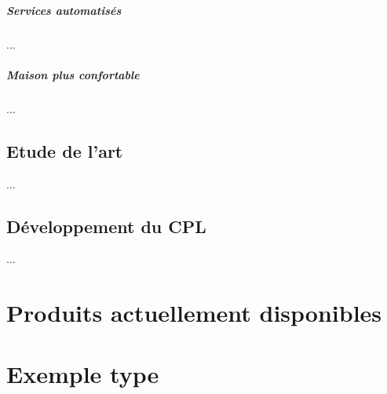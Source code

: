             \paragraph{Services automatisés}
                ...
            \paragraph{Maison plus confortable}
                ...
    \section{Etude de l’art}
        ...
    \section{Développement du CPL}
        ...



\chapter{Produits actuellement disponibles}



\chapter{Exemple type}
